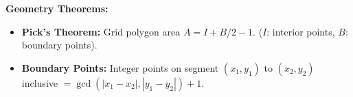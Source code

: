 \textbf{Geometry Theorems:}
\begin{itemize}
    \item \textbf{Pick's Theorem:} Grid polygon area $A = I + B/2 - 1$. ($I$: interior points, $B$: boundary points).
    \item \textbf{Boundary Points:} Integer points on segment $(x_1, y_1)$ to $(x_2, y_2)$ inclusive $=\gcd(|x_1 - x_2|, |y_1 - y_2|) + 1$.
\end{itemize}
